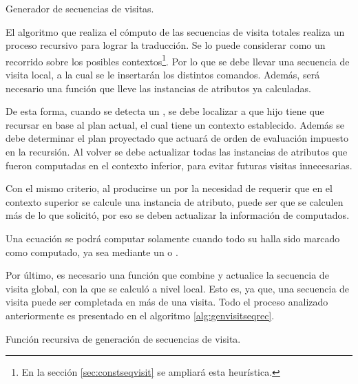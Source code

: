 \begin{algorithm}[!ht]

\vspace{-0.5cm}
\caption{\label{alg:genvisitseq}Generador de secuencias de visitas.}
\end{algorithm}

El algoritmo que realiza el cómputo de las secuencias de visita totales realiza un proceso recursivo para lograr la traducción. Se lo puede considerar como un recorrido sobre los posibles contextos\footnote{En la sección \ref{sec:constseqvisit} se ampliará esta heurística.}. Por lo que se debe llevar una secuencia de visita local, a la cual se le insertarán los distintos comandos. Además, será necesario una función que lleve las instancias de atributos ya calculadas.

De esta forma, cuando se detecta un , se debe localizar a que hijo tiene que recursar en base al plan actual, el cual tiene un contexto establecido. Además se debe determinar el plan proyectado que actuará de orden de evaluación impuesto en la recursión. Al volver se debe actualizar todas las instancias de atributos que fueron computadas en el contexto inferior, para evitar futuras visitas innecesarias.

Con el mismo criterio, al producirse un  por la necesidad de requerir que en el contexto superior se calcule una instancia de atributo, puede ser que se calculen más de lo que solicitó, por eso se deben actualizar la información de computados.

Una ecuación se podrá computar solamente cuando todo su  halla sido marcado como computado, ya sea mediante un  o .

Por último, es necesario una función que combine y actualice la secuencia de visita global, con la que se calculó a nivel local. Esto es, ya que, una secuencia de visita puede ser completada en más de una visita. Todo el proceso analizado anteriormente es presentado en el algoritmo \ref{alg:genvisitseqrec}.

\begin{algorithm}[!ht]

\vspace{-0.5cm}
\caption{\label{alg:genvisitseqrec}Función recursiva de generación de secuencias de visita.}
\end{algorithm}


